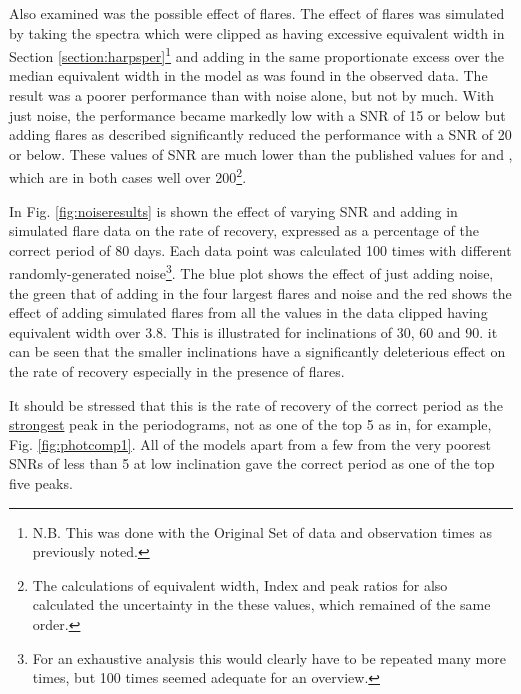 Also examined was the possible effect of flares. The effect of flares was simulated by taking the spectra
which were clipped as having excessive equivalent width in Section \ref{section:harpsper}\footnote{N.B. This was done
  with the Original Set of data and observation times as previously noted.} and adding in the same
proportionate excess over the median equivalent width in the model as was found in the observed data. The result was a
poorer performance than with noise alone, but not by much. With just noise, the performance became markedly low with a
SNR of 15 or below but adding flares as described significantly reduced the performance with a SNR of 20 or below. These
values of SNR are much lower than the published values for {\uves} and {\harps}, which are in both cases well over
200\footnote{The calculations of equivalent width, {\ha} Index and peak ratios for {\harps} also calculated the
  uncertainty in the these values, which remained of the same order.}.

In Fig. \ref{fig:noiseresults} is shown the effect of varying SNR and adding in simulated flare data on the rate of
recovery, expressed as a percentage of the correct period of 80 days. Each data point was calculated 100 times with
different randomly-generated noise\footnote{For an exhaustive analysis this would clearly have to be repeated many more
  times, but 100 times seemed adequate for an overview.}. The blue plot shows the effect of just adding
noise, the green that of adding in the four largest flares and noise and the red shows the effect of adding simulated
flares from all the values in the {\harps} data clipped having equivalent width over 3.8. This is illustrated for
inclinations of 30{\degree}, 60{\degree} and 90{\degree}. it can be seen that the smaller inclinations have a
significantly deleterious effect on the rate of recovery especially in the presence of flares.

It should be stressed that this is the rate of recovery of the correct period as the \underline{strongest} peak in the
periodograms, not as one of the top 5 as in, for example, Fig. \ref{fig:photcomp1}. All of the models apart from a
few from the very poorest SNRs of less than 5 at low inclination gave the correct period as one of the top five peaks.

